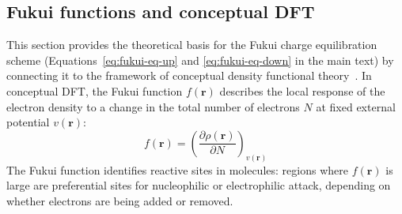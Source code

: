 \documentclass[aps,%
superscriptaddress,
 amsmath,amssymb,
floatfix,
twocolumn
]{revtex4-2}
\begin{document}
\subsection{Fukui functions and conceptual DFT}
\label{sec:fukui-derivation}

This section provides the theoretical basis for the Fukui charge equilibration scheme (Equations~\ref{eq:fukui-eq-up} and \ref{eq:fukui-eq-down} in the main text) by connecting it to the framework of conceptual density functional theory~\cite{parr1983,geerlings2003conceptual}. In conceptual DFT, the Fukui function $f(\mathbf{r})$ describes the local response of the electron density to a change in the total number of electrons $N$ at fixed external potential $v(\mathbf{r})$:
\begin{equation}
f(\mathbf{r}) = \left( \frac{\partial \rho(\mathbf{r})}{\partial N} \right)_{v(\mathbf{r})}
\end{equation}
The Fukui function identifies reactive sites in molecules: regions where $f(\mathbf{r})$ is large are preferential sites for nucleophilic or electrophilic attack, depending on whether electrons are being added or removed.
\end{document}
